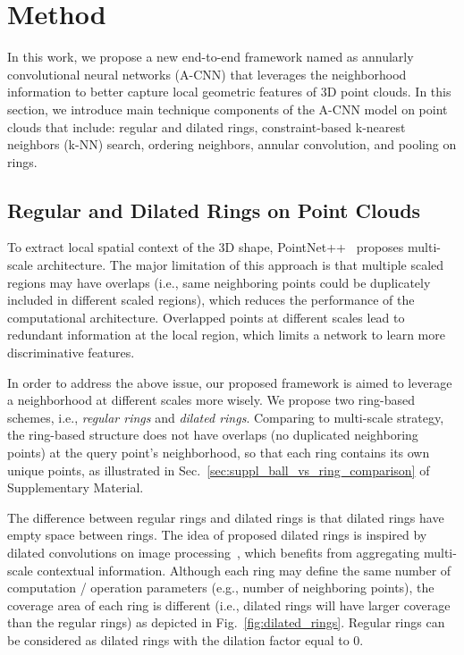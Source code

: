 \documentclass[10pt,twocolumn,letterpaper]{article}
\begin{document}
\section{Method}
\label{sec:method}
In this work, we propose a new end-to-end framework named as annularly convolutional neural networks (A-CNN) that leverages the neighborhood information to better capture local geometric features of 3D point clouds. In this section, we introduce main technique components of the A-CNN model on point clouds that include: regular and dilated rings, constraint-based k-nearest neighbors (k-NN) search, ordering neighbors, annular convolution, and pooling on rings.



\subsection{Regular and Dilated Rings on Point Clouds}
\label{sec:rings}
To extract local spatial context of the 3D shape, PointNet++~\cite{qi2017pointnet++} proposes multi-scale architecture. The major limitation of this approach is that multiple scaled regions may have overlaps (i.e., same neighboring points could be duplicately included in different scaled regions), which reduces the performance of the computational architecture. Overlapped points at different scales lead to redundant information at the local region, which limits a network to learn more discriminative features.

In order to address the above issue, our proposed framework is aimed to leverage a neighborhood at different scales more wisely. We propose two ring-based schemes, i.e., \emph{regular rings} and \emph{dilated rings}. Comparing to multi-scale strategy, the ring-based structure does not have overlaps (no duplicated neighboring points) at the query point's neighborhood, so that each ring contains its own unique points, as illustrated in Sec.~\ref{sec:suppl_ball_vs_ring_comparison} of Supplementary Material.

The difference between regular rings and dilated rings is that dilated rings have empty space between rings. The idea of proposed dilated rings is inspired by dilated convolutions on image processing~\cite{YuKoltun2016}, which benefits from aggregating multi-scale contextual information. Although each ring may define the same number of computation / operation parameters (e.g., number of neighboring points), the coverage area of each ring is different (i.e., dilated rings will have larger coverage than the regular rings) as depicted in Fig.~\ref{fig:dilated_rings}. Regular rings can be considered as dilated rings with the dilation factor equal to 0.
\end{document}
